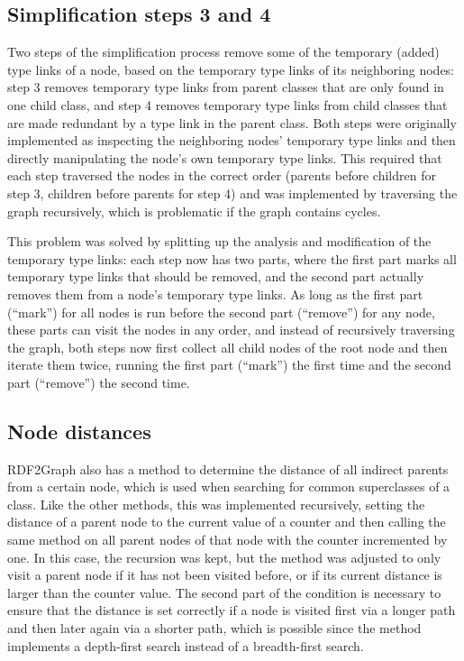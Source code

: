 \subsection{Simplification steps 3 and 4}
\label{subsec:RDF2Graph+Wikidata:cyclic-graphs:simplify-step-3+4}

Two steps of the simplification process
remove some of the temporary (added) \glspl{type link} of a node,
based on the temporary \glspl{type link} of its neighboring nodes:
step 3 removes temporary \glspl{type link} from parent classes that are only found in one child class,
and step 4 removes temporary \glspl{type link} from child classes that are made redundant by a \gls{type link} in the parent class.
Both steps were originally implemented as inspecting the neighboring nodes’ temporary \glspl{type link}
and then directly manipulating the node’s own temporary \glspl{type link}.
This required that each step traversed the nodes in the correct order
(parents before children for step 3,
children before parents for step 4)
and was implemented by traversing the graph recursively,
which is problematic if the graph contains cycles.

This problem was solved by splitting up the analysis and modification of the temporary \glspl{type link}:
each step now has two parts,
where the first part marks all temporary \glspl{type link} that should be removed,
and the second part actually removes them from a node’s temporary \glspl{type link}.
As long as the first part (“mark”) for all nodes is run before the second part (“remove”) for any node,
these parts can visit the nodes in any order,
and instead of recursively traversing the graph,
both steps now first collect all child nodes of the root node
and then iterate them twice,
running the first part (“mark”) the first time and the second part (“remove”) the second time.

\subsection{Node distances}
\label{subsec:RDF2Graph+Wikidata:cyclic-graph:distance}

\Gls{RDF2Graph} also has a method to determine the distance of all indirect parents from a certain node,
which is used when searching for common superclasses of a class.
Like the other methods, this was implemented recursively,
setting the distance of a parent node to the current value of a counter
and then calling the same method on all parent nodes of that node with the counter incremented by one.
In this case, the recursion was kept,
but the method was adjusted to only visit a parent node
if it has not been visited before, or if its current distance is larger than the counter value.
The second part of the condition is necessary to ensure that the distance is set correctly
if a node is visited first via a longer path and then later again via a shorter path,
which is possible since the method implements a depth-first search instead of a breadth-first search.

